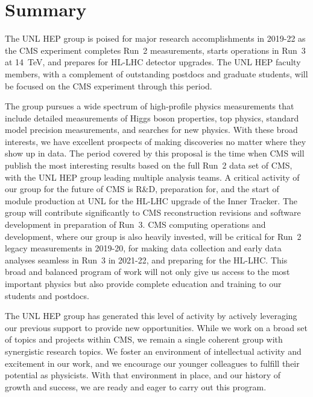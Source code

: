 \section{Summary}

The UNL HEP group is poised for major research accomplishments in 2019-22 as the CMS experiment completes Run~2 measurements, starts operations in Run~3 at 14~TeV, and prepares for HL-LHC detector upgrades. The UNL HEP faculty members, with a complement of outstanding postdocs and graduate students, will be focused on the CMS experiment through this period.

The group pursues a wide spectrum of high-profile physics measurements that include detailed measurements of Higgs boson properties, top physics, standard model precision measurements, and searches for new physics. With these broad interests, we have excellent prospects of making discoveries no matter where they show up in data. The period covered by this proposal is the time when CMS will publish the most interesting results based on the full Run~2 data set of CMS, with the UNL HEP group leading multiple analysis teams. A critical activity of our group for the future of CMS is R\&D, preparation for, and the start of module production at UNL for the HL-LHC upgrade of the Inner Tracker. The group will contribute significantly to CMS reconstruction revisions and software development in preparation of Run~3. CMS computing operations and development, where our group is also heavily invested, will be critical for Run~2 legacy measurements in 2019-20, for making data collection and early data analyses seamless in Run~3 in 2021-22, and preparing for the HL-LHC. This broad and balanced program of work will not only give us access to the most important physics but also provide complete education and training to our students and postdocs.

The UNL HEP group has generated this level of activity by actively leveraging our previous support to provide new opportunities. While we work on a broad set of topics and projects within CMS, we remain a single coherent group with synergistic research topics.
We foster an environment of intellectual activity and excitement in our work, and we encourage our younger colleagues to fulfill their potential as physicists. With that environment in place, and our history of growth and success, we are ready and eager to carry out this program.
